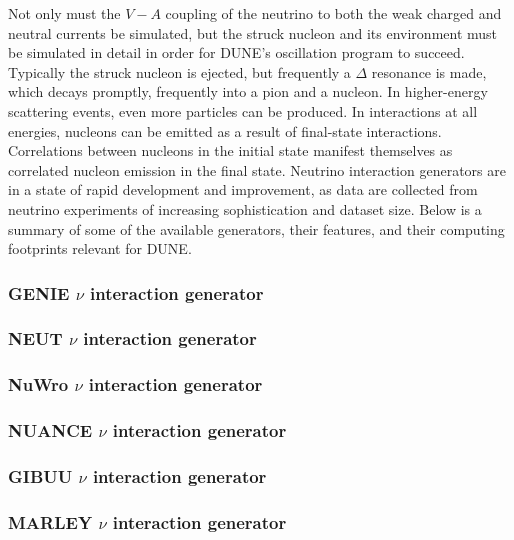 Not only must the $V-A$ coupling of the neutrino to both the weak charged and neutral currents be simulated,
but the struck nucleon and its environment must be simulated in detail in order for DUNE's oscillation
program to succeed.  Typically the struck nucleon is ejected, but frequently a $\Delta$ resonance is made,
which decays promptly, frequently into a pion and a nucleon.  In higher-energy scattering events, even
more particles can be produced.  In interactions at all energies, nucleons can be emitted as a result
of final-state interactions.  Correlations between nucleons in the initial state manifest themselves as
correlated nucleon emission in the final state.  Neutrino interaction generators are in a state of rapid
development and improvement, as data are collected from neutrino experiments of increasing sophistication
and dataset size.  Below is a summary of some of the available generators, their features, and their
computing footprints relevant for DUNE.

\subsubsection{GENIE $\nu$ interaction generator}

\subsubsection{NEUT $\nu$ interaction generator}

\subsubsection{NuWro $\nu$ interaction generator}

\subsubsection{NUANCE $\nu$ interaction generator}

\subsubsection{GIBUU $\nu$ interaction generator}

\subsubsection{MARLEY $\nu$ interaction generator}

